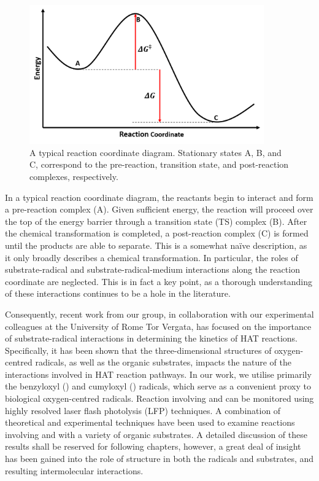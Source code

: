 \begin{figure}[htb]
  \centering
  \includegraphics[width=0.9\textwidth]{figures/pes}
  \caption[A typical reaction coordinate diagram.]{A typical reaction coordinate diagram. Stationary states A, B, and C, correspond to the pre-reaction, transition state, and post-reaction complexes, respectively.}
\label{fig:pes}
\end{figure}

In a typical reaction coordinate diagram, the reactants begin to interact and form a pre-reaction complex (A). Given sufficient energy, the reaction will proceed over the top of the energy barrier through a transition state (TS) complex (B). After the chemical transformation is completed, a post-reaction complex (C) is formed until the products are able to separate. This is a somewhat na\"{i}ve description, as it only broadly describes a chemical transformation. In particular, the roles of substrate-radical and substrate-radical-medium interactions along the reaction coordinate are neglected. This is in fact a key point, as a thorough understanding of these interactions continues to be a hole in the literature.

Consequently, recent work from our group, in collaboration with our experimental colleagues at the University of Rome Tor Vergata, has focused on the importance of substrate-radical interactions in determining the kinetics of HAT reactions. Specifically, it has been shown that the three-dimensional structures of oxygen-centred radicals, as well as the organic substrates, impacts the nature of the interactions involved in HAT reaction pathways.\cite{Salamone2015Rev} In our work, we utilise primarily the benzyloxyl (\bno) and cumyloxyl (\cumo) radicals, which serve as a convenient proxy to biological oxygen-centred radicals. Reaction involving \bno and \cumo can be monitored using highly resolved laser flash photolysis (LFP) techniques. A combination of theoretical and experimental techniques have been used to examine reactions involving \bno and \cumo with a variety of organic substrates. A detailed discussion of these results shall be reserved for following chapters, however, a great deal of insight has been gained into the role of structure in both the radicals and substrates, and resulting intermolecular interactions.

